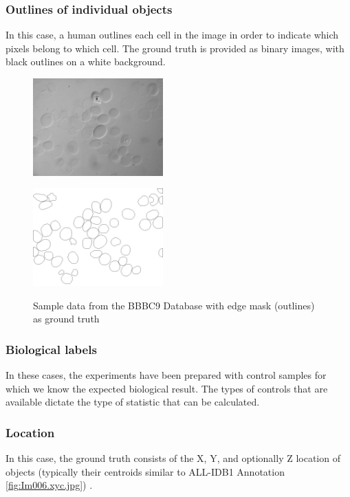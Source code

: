 {\subsubsection{Outlines of individual objects}
\hspace{\parindent}
In this case, a human outlines each cell in the image in order to indicate which pixels belong to which cell. The ground truth is provided as binary images, with black outlines on a white background.

\begin{figure}[H]
\begin{minipage}[c]{0.4\linewidth}
\centering
\includegraphics[width=50mm]{../images/48hr-001-DIC.jpg}
\label{fig:BBBC009_img}
\end{minipage}
\hfill
\begin{minipage}[c]{0.4\linewidth}
\centering
\includegraphics[width=50mm]{../images/48hr-001-DIC_.jpg}
\label{fig:BBBC009_O}
\end{minipage}
\caption{Sample data from the BBBC9 Database with edge mask (outlines) as ground truth}
\end{figure}

\subsubsection{Biological labels}
\hspace{\parindent}
In these cases, the experiments have been prepared with control samples for which we know the expected biological result. The types of controls that are available dictate the type of statistic that can be calculated.

\subsubsection{Location}
\hspace{\parindent}
In this case, the ground truth consists of the X, Y, and optionally Z location of objects (typically their centroids similar to ALL-IDB1 Annotation \ref{fig:Im006.xyc.jpg}) .

}
